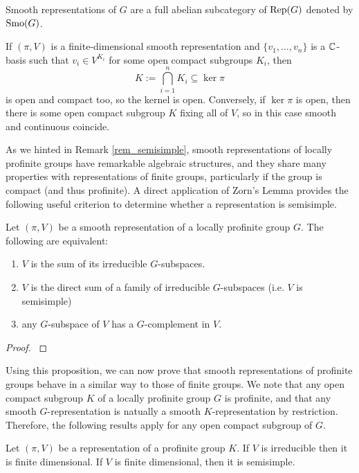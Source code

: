 Smooth representations of $G$ are a full abelian subcategory of $\mathrm{Rep}(G)$ denoted by $\mathrm{Smo}(G)$. 


\begin{rem}
    If $(\pi,V)$ is a finite-dimensional smooth representation and $\{v_1,\ldots,v_n\}$ is a $\mathbb{C}$-basis such that $v_i\in V^{K_i}$ for some open compact subgroups $K_i$, then 
    $$K:=\bigcap_{i=1}^n K_i\subseteq\ker\pi$$
    is open and compact too, so the kernel is open. 
    Conversely, if $\ker\pi$ is open, then there is some open compact subgroup $K$ fixing all of $V$, so in this case smooth and continuous coincide. 
\end{rem}


As we hinted in Remark \ref{rem_semisimple}, smooth representations of locally profinite groups have remarkable algebraic structures, and they share many properties with representations of finite groups, particularly if the group is compact (and thus profinite). A direct application of Zorn's Lemma provides the following useful criterion to determine whether a representation is semisimple. 

\begin{prop}\label{prop_semisimple}
    Let $(\pi,V)$ be a smooth representation of a locally profinite group $G$. The following are equivalent:
    \begin{enumerate}
        \item $V$ is the sum of its irreducible $G$-subspaces.
        \item $V$ is the direct sum of a family of irreducible $G$-subspaces (i.e. $V$ is semisimple)
        \item any $G$-subspace of $V$ has a $G$-complement in $V$.
    \end{enumerate}
\end{prop}

\begin{proof}
    \cite[Lemma 2.2]{BH1}
\end{proof}

Using this proposition, we can now prove that smooth representations of profinite groups behave in a similar way to those of finite groups. We note that any open compact subgroup $K$ of a locally profinite group $G$ is profinite, and that any smooth $G$-representation is natually a smooth $K$-representation by restriction. Therefore, the following results apply for any open compact subgroup of $G$.

\begin{prop}\label{lem_profinite_smooth}
    Let $(\pi,V)$ be a representation of a profinite group $K$. If $V$ is irreducible then it is finite dimensional. If $V$ is finite dimensional, then it is semisimple.
\end{prop}

